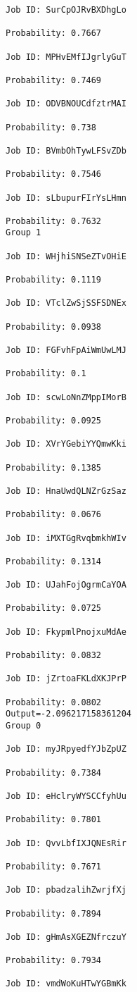\documentclass[11pt]{article}
\begin{document}
\begin{Verbatim}[commandchars=\\\{\}]
Job ID: SurCpOJRvBXDhgLo

Probability: 0.7667

Job ID: MPHvEMfIJgrlyGuT

Probability: 0.7469

Job ID: ODVBNOUCdfztrMAI

Probability: 0.738

Job ID: BVmbOhTywLFSvZDb

Probability: 0.7546

Job ID: sLbupurFIrYsLHmn

Probability: 0.7632
Group 1

Job ID: WHjhiSNSeZTvOHiE

Probability: 0.1119

Job ID: VTclZwSjSSFSDNEx

Probability: 0.0938

Job ID: FGFvhFpAiWmUwLMJ

Probability: 0.1

Job ID: scwLoNnZMppIMorB

Probability: 0.0925

Job ID: XVrYGebiYYQmwKki

Probability: 0.1385

Job ID: HnaUwdQLNZrGzSaz

Probability: 0.0676

Job ID: iMXTGgRvqbmkhWIv

Probability: 0.1314

Job ID: UJahFojOgrmCaYOA

Probability: 0.0725

Job ID: FkypmlPnojxuMdAe

Probability: 0.0832

Job ID: jZrtoaFKLdXKJPrP

Probability: 0.0802
Output=-2.096217158361204
Group 0

Job ID: myJRpyedfYJbZpUZ

Probability: 0.7384

Job ID: eHclryWYSCCfyhUu

Probability: 0.7801

Job ID: QvvLbfIXJQNEsRir

Probability: 0.7671

Job ID: pbadzalihZwrjfXj

Probability: 0.7894

Job ID: gHmAsXGEZNfrczuY

Probability: 0.7934

Job ID: vmdWoKuHTwYGBmKk


\end{Verbatim}
\end{document}
